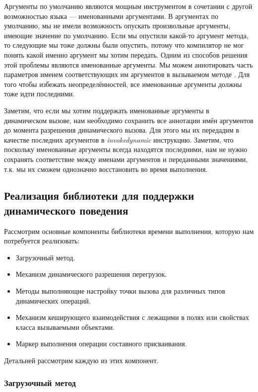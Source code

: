 Аргументы по умолчанию являются мощным инструментом в сочетании с другой возможностью языка --- именованными аргументами. В аргументах по умолчанию, мы не имели возможность опускать произвольные аргументы, имеющие значение по умолчанию. Если мы опустили какой-то аргумент метода, то следующие мы тоже должны были опустить, потому что компилятор не мог понять какой именно аргумент мы хотим передать. Одним из способов решения этой проблемы являются именованные аргументы. Мы можем аннотировать часть параметров именем соответствующих им аргументов в вызываемом методе \cite{book:jemerov2017kotlininAction}. Для того чтобы избежать неопределённостей, все именованные аргументы должны тоже идти последними.

Заметим, что если мы хотим поддержать именованные аргументы в динамическом вызове, нам необходимо сохранить все аннотации имён аргументов до момента разрешения динамического вызова. Для этого мы их передадим в качестве последних аргументов в \textit{invokedynamic} инструкцию. Заметим, что поскольку именованные аргументы всегда находятся последними, нам не нужно сохранять соответствие между именами аргументов и переданными значениями, т.к. мы их сможем однозначно восстановить во время выполнения.


\subsection{Реализация библиотеки для поддержки динамического поведения}
\label{sec:dynamicLibrary}

Рассмотрим основные компоненты библиотеки времени выполнения, которую нам потребуется реализовать:

\begin{itemize}
    \item Загрузочный метод.
    \item Механизм динамического разрешения перегрузок.
    \item Методы выполняющие настройку точки вызова для различных типов динамических операций.
    \item Механизм кеширующего взаимодействия с лежащими в полях или свойствах класса вызываемыми объектами.
    \item Маркер выполнения операции составного присваивания.
\end{itemize}

Детальней рассмотрим каждую из этих компонент.

\subsubsection{Загрузочный метод}

